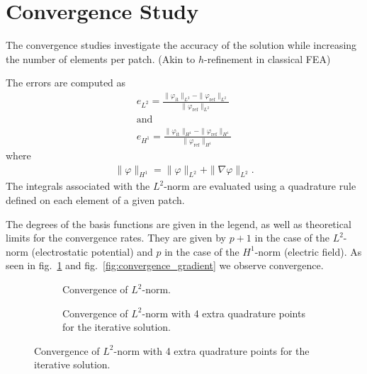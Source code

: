 %   

%   

\section{Convergence Study}
The convergence studies investigate the accuracy of the solution while increasing the number of elements per patch. (Akin to $h$-refinement in classical FEA)

The errors are computed as
\begin{align}
  e_{L^2} = \frac{\| \varphi_\mathrm{it} \|_{L^2} - \| \varphi_\mathrm{ref} \|_{L^2}}{\| \varphi_\mathrm{ref} \|_{L^2}}\\
  \mathrm{and}\\
  e_{H^1} = \frac{\| \varphi_\mathrm{it} \|_{H^1} - \| \varphi_\mathrm{ref} \|_{H^1}}{\| \varphi_\mathrm{ref} \|_{H^1}}
\end{align}
where
\begin{align}
  \| \varphi \|_{H^1} = \| \varphi \|_{L^2} + \| \nabla\varphi \|_{L^2}.
\end{align}
The integrals associated with the $L^2$-norm are evaluated using a quadrature rule defined on each element of a given patch.

The degrees of the basis functions are given in the legend, as well as theoretical limits for the convergence rates. They are given by $p+1$ in the case of the $L^2$-norm (electrostatic potential) and $p$ in the case of the $H^1$-norm (electric field). As seen in fig.~\ref{fig:convergence_potential} and fig.~\ref{fig:convergence_gradient} we observe convergence.

\begin{figure}[H]
  \begin{center}
    \begin{subfigure}{0.4\textwidth}
      
      \caption{Convergence of $L^2$-norm.}
      \label{fig:convergence_potential}
    \end{subfigure}
    \qquad \qquad
    \begin{subfigure}{0.4\textwidth}
      
      \caption{Convergence of $L^2$-norm with 4 extra quadrature points for the iterative solution.}
      \label{fig:convergence_potential_offset}
    \end{subfigure}
  \end{center}
\end{figure}

